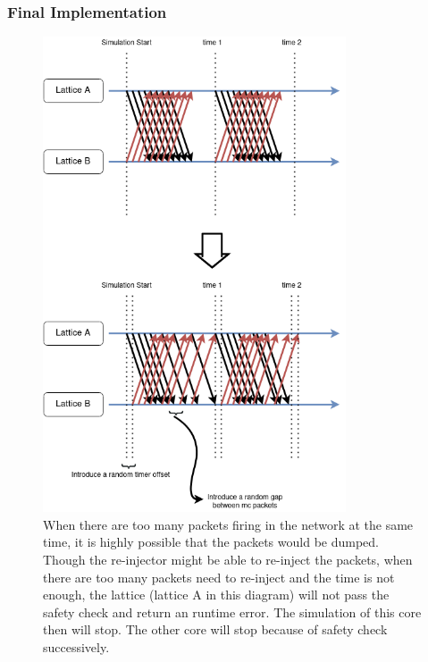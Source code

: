 \subsubsection{Final Implementation}
\begin{figure}[!tb]
   \centering
       \includegraphics[width=0.8\textwidth]{figures/optimize.png}
       \caption{When there are too many packets firing in the network at the same time, it is highly possible that the packets would be dumped. Though the re-injector might be able to re-inject the packets, when there are too many packets need to re-inject and the time is not enough, the lattice (lattice A in this diagram) will not pass the safety check and return an runtime error. The simulation of this core then will stop. The other core will stop because of safety check successively.}
       \label{fig:packet_error}
\end{figure}

